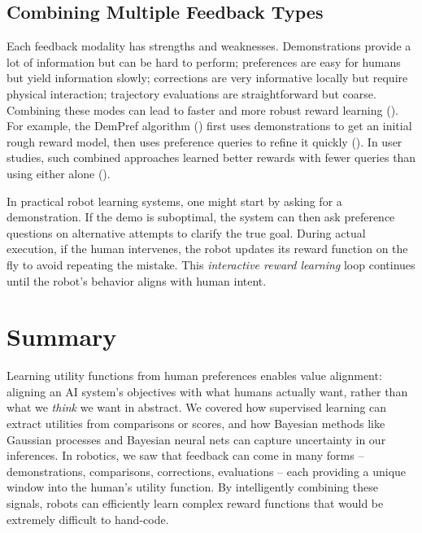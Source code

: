 \documentclass[
  letterpaper,
  numbers=noenddot,
  DIV=11]{scrreprt}
\theoremstyle{plain}
\theoremstyle{definition}
\theoremstyle{remark}
\begin{document}
\subsection*{Combining Multiple Feedback
Types}\label{combining-multiple-feedback-types}

Each feedback modality has strengths and weaknesses. Demonstrations
provide a lot of information but can be hard to perform; preferences are
easy for humans but yield information slowly; corrections are very
informative locally but require physical interaction; trajectory
evaluations are straightforward but coarse. Combining these modes can
lead to faster and more robust reward learning
(). For
example, the DemPref algorithm
() first
uses demonstrations to get an initial rough reward model, then uses
preference queries to refine it quickly
(). In user
studies, such combined approaches learned better rewards with fewer
queries than using either alone
().

In practical robot learning systems, one might start by asking for a
demonstration. If the demo is suboptimal, the system can then ask
preference questions on alternative attempts to clarify the true goal.
During actual execution, if the human intervenes, the robot updates its
reward function on the fly to avoid repeating the mistake. This
\emph{interactive reward learning} loop continues until the robot's
behavior aligns with human intent.

\section{Summary}\label{summary}

Learning utility functions from human preferences enables value
alignment: aligning an AI system's objectives with what humans actually
want, rather than what we \emph{think} we want in abstract. We covered
how supervised learning can extract utilities from comparisons or
scores, and how Bayesian methods like Gaussian processes and Bayesian
neural nets can capture uncertainty in our inferences. In robotics, we
saw that feedback can come in many forms -- demonstrations, comparisons,
corrections, evaluations -- each providing a unique window into the
human's utility function. By intelligently combining these signals,
robots can efficiently learn complex reward functions that would be
extremely difficult to hand-code.
\end{document}
